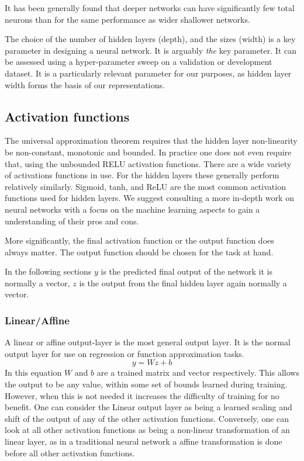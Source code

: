 \documentclass[12pt,parskip]{komatufte}
\begin{document}
It has been generally found that deeper networks can have significantly few total neurons than for the same performance as wider shallower networks.

The choice of the number of hidden layers (depth),
and the sizes (width) is a key parameter in designing a neural network.
It is arguably \emph{the} key parameter.
It can be assessed using a hyper-parameter sweep on a validation or development dataset.
It is a particularly relevant parameter for our purposes, as hidden layer width forms the basis of our representations.



\subsection{Activation functions}

The universal approximation theorem requires that the hidden layer non-linearity be non-constant, monotonic and bounded.
In practice one does not even require that, using the unbounded RELU activation functions.
There are a wide variety of activations functions in use.
For the hidden layers these generally perform relatively similarly.
Sigmoid, tanh, and ReLU are the most common activation functions used for hidden layers.
We suggest consulting a more in-depth work on neural networks with a focus on the machine learning aspects to gain a understanding of their pros and cons.

More significantly, the final activation function or the output function does always matter.
The output function should be chosen for the task at hand.

In the following sections $y$ is the predicted final output of the network it is normally a vector, $z$ is the output from the final hidden layer again normally a vector.

\subsubsection{Linear/Affine}
A linear or affine output-layer is the most general output layer.
It is the normal output layer for use on regression or function approximation tasks.
\begin{equation}
y=Wz + b
\end{equation}
In this equation $W$ and $b$ are a trained matrix and vector respectively.
This allows the output to be any value, within some set of bounds learned during training.
However, when this is not needed it increases the difficulty of training for no benefit.
One can consider the Linear output layer as being a learned scaling and shift of the output of any of the other activation functions.
Conversely, one can look at all other activation functions as being a non-linear transformation of an linear layer, as in a traditional neural network a affine transformation is done before all other activation functions.
\end{document}
